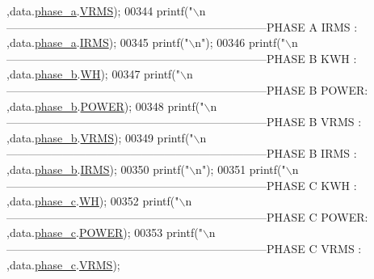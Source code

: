 \begin{DoxyCode}
{{{{{{{{{      ,data.\hyperlink{a00028_ad7205e9853a503d2fab0697f5a301f6c}{phase\_a}.\hyperlink{a00029_a08415029e214174a01bc6487ff98ee9b}{VRMS});
00344         printf(\textcolor{stringliteral}{"\(\backslash\)n---------------------------------------------------------------------PHASE A IRMS : %
      ,data.\hyperlink{a00028_ad7205e9853a503d2fab0697f5a301f6c}{phase\_a}.\hyperlink{a00029_a4f87f30b543e89e2e5dfa1b8f3f58eff}{IRMS});
00345         printf(\textcolor{stringliteral}{"\(\backslash\)n"});
00346         printf(\textcolor{stringliteral}{"\(\backslash\)n---------------------------------------------------------------------PHASE B KWH  : %
      ,data.\hyperlink{a00028_a48734adeb4d59d056b6e39c6e08fe21e}{phase\_b}.\hyperlink{a00029_a8dd6d8406db4e214238b3eff481e4ea0}{WH});
00347         printf(\textcolor{stringliteral}{"\(\backslash\)n---------------------------------------------------------------------PHASE B POWER: %
      ,data.\hyperlink{a00028_a48734adeb4d59d056b6e39c6e08fe21e}{phase\_b}.\hyperlink{a00029_a8a9794fa4c6a69b457d1eb04b017ef1e}{POWER});
00348         printf(\textcolor{stringliteral}{"\(\backslash\)n---------------------------------------------------------------------PHASE B VRMS : %
      ,data.\hyperlink{a00028_a48734adeb4d59d056b6e39c6e08fe21e}{phase\_b}.\hyperlink{a00029_a08415029e214174a01bc6487ff98ee9b}{VRMS});
00349         printf(\textcolor{stringliteral}{"\(\backslash\)n---------------------------------------------------------------------PHASE B IRMS : %
      ,data.\hyperlink{a00028_a48734adeb4d59d056b6e39c6e08fe21e}{phase\_b}.\hyperlink{a00029_a4f87f30b543e89e2e5dfa1b8f3f58eff}{IRMS});
00350         printf(\textcolor{stringliteral}{"\(\backslash\)n"});
00351         printf(\textcolor{stringliteral}{"\(\backslash\)n---------------------------------------------------------------------PHASE C KWH  : %
      ,data.\hyperlink{a00028_ad8892f27909cf51f7603adfc00d224df}{phase\_c}.\hyperlink{a00029_a8dd6d8406db4e214238b3eff481e4ea0}{WH});
00352         printf(\textcolor{stringliteral}{"\(\backslash\)n---------------------------------------------------------------------PHASE C POWER: %
      ,data.\hyperlink{a00028_ad8892f27909cf51f7603adfc00d224df}{phase\_c}.\hyperlink{a00029_a8a9794fa4c6a69b457d1eb04b017ef1e}{POWER});
00353         printf(\textcolor{stringliteral}{"\(\backslash\)n---------------------------------------------------------------------PHASE C VRMS : %
      ,data.\hyperlink{a00028_ad8892f27909cf51f7603adfc00d224df}{phase\_c}.\hyperlink{a00029_a08415029e214174a01bc6487ff98ee9b}{VRMS});
}}}}}}}}}}}}}}}}}
\end{DoxyCode}
